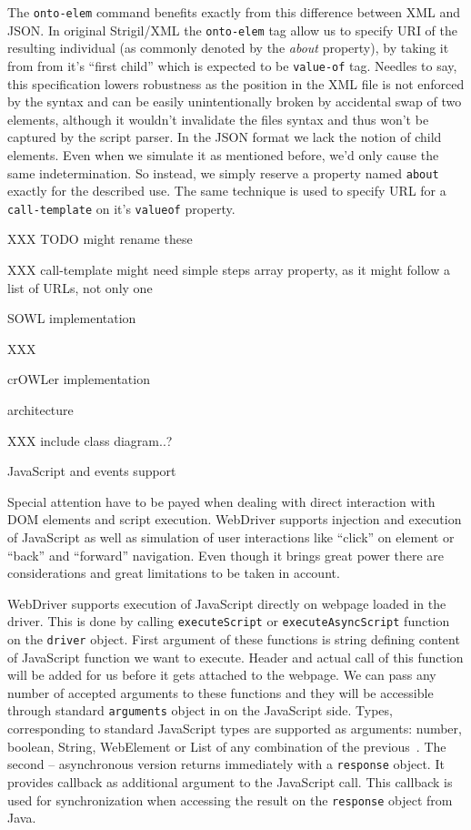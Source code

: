 The {\tt onto-elem} command benefits exactly from this difference between
XML and JSON.  In original Strigil/XML the {\tt onto-elem} tag allow us to
specify URI of the resulting individual (as commonly denoted by the {\em about}
property), by taking it from from it's ``first child'' which is expected to
be {\tt value-of} tag. Needles to say, this specification lowers robustness as
the position in the XML file is not enforced by the syntax and can be easily
unintentionally broken by accidental swap of two elements, although it wouldn't
invalidate the files syntax and thus won't be captured by the script parser. In
the JSON format we lack the notion of child elements. Even when we simulate it
as mentioned before, we'd only cause the same indetermination. So instead, we
simply reserve a property named {\tt about} exactly for the described use. 
The same technique is used to specify URL for a {\tt call-template} on it's
{\tt valueof} property. 

XXX TODO might rename these

XXX call-template might need simple steps array property, as it might follow a
list of URLs, not only one

\sec SOWL implementation

XXX 

\sec crOWLer implementation

\secc architecture

XXX include class diagram..?


\secc JavaScript and events support

Special attention have to be payed when dealing with direct interaction with
DOM elements and script execution. WebDriver supports injection and execution
of JavaScript as well as simulation of user interactions like ``click'' on
element or ``back'' and ``forward'' navigation. Even though it brings great
power there are considerations and great limitations to be taken in account. 

WebDriver supports execution of JavaScript directly on webpage loaded in the
driver. This is done by calling {\tt executeScript} or {\tt executeAsyncScript}
function on the {\tt driver} object. First argument of these functions is
string defining content of JavaScript function we want to execute. Header and
actual call of this function will be added for us before it gets attached to
the webpage. We can pass any number of accepted arguments to these functions
and they will be accessible through standard {\tt arguments} object in on the
JavaScript side. Types, corresponding to standard JavaScript types are
supported as arguments: number, boolean, String, WebElement or List of any
combination of the previous~. The second -- asynchronous version returns
immediately with a {\tt response} object. It provides callback as additional
argument to the JavaScript call. This callback is used for synchronization when
accessing the result on the {\tt response} object from Java.  

